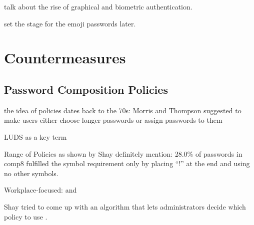 talk about the rise of graphical and biometric authentication. 


set the stage for the emoji passwords later. 


\section{Countermeasures}


	\subsection{Password Composition Policies}
	
	the idea of policies dates back to the 70s: Morris and Thompson suggested to make users
	either choose longer passwords or assign passwords to them \cite{Morris1979PasswordSecurity}
	
	
	
	
	LUDS as a key term \cite{Wheeler2016zxcvbn}
	
		
	Range of Policies as shown by Shay \cite{Shay2014CanLongPasswordsBeSecureAndUsable}
	definitely mention: 28.0\% of passwords in comp8 fulfilled the symbol requirement only by placing ``!'' at the end and using no other symbols. 
	
	\cite{ZhangKennedy2016RevisitingPasswordRules}
	
	
	Workplace-focused: \cite{Inglesant2010TrueCostOfUnusablePolicies} and \cite{Zakaria2013DesigningEffectiveSecurityMessages}
	
	\cite{Florencio2014AdministratorsGuide} 
	
	\cite{Ur2015PWCreationLab}
	
	\cite{Shay2010EncounteringPasswordRequirements}
	
	\cite{Shay2016DesigningPasswordPolicies}
	
	\cite{Weir2010MetricsPolicies}
	
	\cite{Wang2015EmperorsPolicies}
	
	
	\cite{Florencio2010WhereDoPoliciesComeFrom}
	
	\cite{Horsch2016PasswordPolicyMarkup}
	
	\cite{Chiasson2015QuantifyingExpiration}
	\cite{Blocki2013OptimizingPasswordPolicies}
	\cite{Komanduri2011OfPasswordsAndPeople}
	
	
	Shay tried to come up with an algorithm that lets administrators decide which policy to use \cite{Shay2009PolicySimulation}.
	
